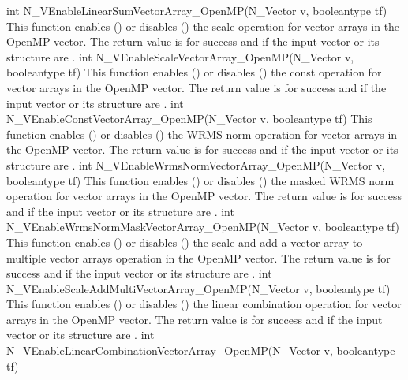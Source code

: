 {
  int N\_VEnableLinearSumVectorArray\_OpenMP(N\_Vector v, booleantype tf)
}
{
  This function enables () or disables () the scale
  operation for vector arrays in the OpenMP vector. The return value is  for
  success and  if the input vector or its  structure are .
}
{
  int N\_VEnableScaleVectorArray\_OpenMP(N\_Vector v, booleantype tf)
}
{
  This function enables () or disables () the const
  operation for vector arrays in the OpenMP vector. The return value is  for
  success and  if the input vector or its  structure are .
}
{
  int N\_VEnableConstVectorArray\_OpenMP(N\_Vector v, booleantype tf)
}
{
  This function enables () or disables () the WRMS norm
  operation for vector arrays in the OpenMP vector. The return value is  for
  success and  if the input vector or its  structure are .
}
{
  int N\_VEnableWrmsNormVectorArray\_OpenMP(N\_Vector v, booleantype tf)
}
{
  This function enables () or disables () the masked WRMS
  norm operation for vector arrays in the OpenMP vector. The return value is
   for success and  if the input vector or its  structure are
  .
}
{
  int N\_VEnableWrmsNormMaskVectorArray\_OpenMP(N\_Vector v, booleantype tf)
}
{
  This function enables () or disables () the scale and
  add a vector array to multiple vector arrays operation in the OpenMP vector. The
  return value is  for success and  if the input vector or its
   structure are .
}
{
  int N\_VEnableScaleAddMultiVectorArray\_OpenMP(N\_Vector v, booleantype tf)
}
{
  This function enables () or disables () the linear
  combination operation for vector arrays in the OpenMP vector. The return value
  is  for success and  if the input vector or its  structure
  are .
}
{
  int N\_VEnableLinearCombinationVectorArray\_OpenMP(N\_Vector v,
  booleantype tf)
}
